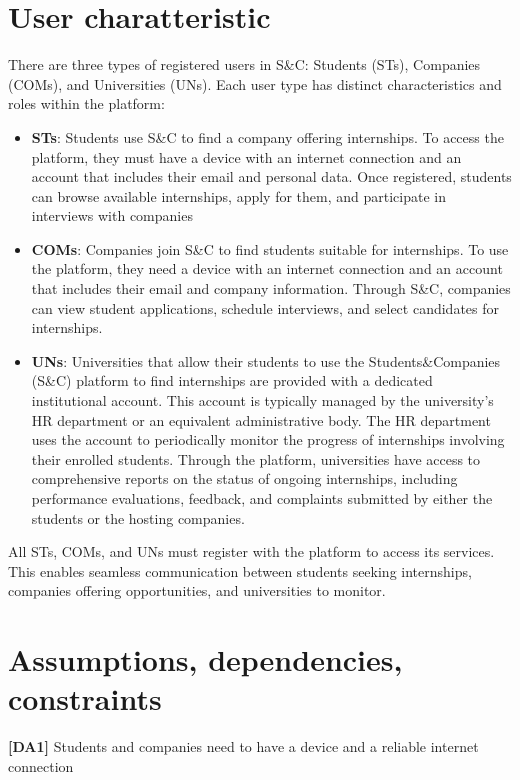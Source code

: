 \section{User charatteristic}

There are three types of registered users in S\&C: Students (STs), Companies (COMs), and Universities (UNs). Each user type has distinct characteristics and roles within the platform:

\begin{itemize}
    \item \textbf{STs}: Students use S\&C to find a company offering internships. To access the platform, they must have a device with an internet connection and an account that includes their email and personal data. Once registered, students can browse available internships, apply for them, and participate in interviews with 
    companies

    \item \textbf{COMs}:  Companies join S\&C to find students suitable for internships. To use the platform, they need a device with an internet connection and an account that includes their email and company information. Through S\&C, companies can view student applications, schedule interviews, and select candidates for internships.

    \item \textbf{UNs}: Universities that allow their students to use the Students\&Companies (S\&C) platform to find internships are provided with a dedicated institutional account. This account is typically managed by the university’s HR department or an equivalent administrative body.
    The HR department uses the account to periodically monitor the progress of internships involving their enrolled students. Through the platform, universities have access to comprehensive reports on the status of ongoing internships, including performance evaluations, feedback, and complaints submitted by either the students or the hosting companies.
    
\end{itemize}

All STs, COMs, and UNs must register with the platform to access its services. This enables seamless communication between students seeking internships, companies offering opportunities, and universities to monitor.

\pagebreak
\section{Assumptions, dependencies, constraints}
\textbf{[DA1] }Students and companies need to have a device and a reliable internet connection 


